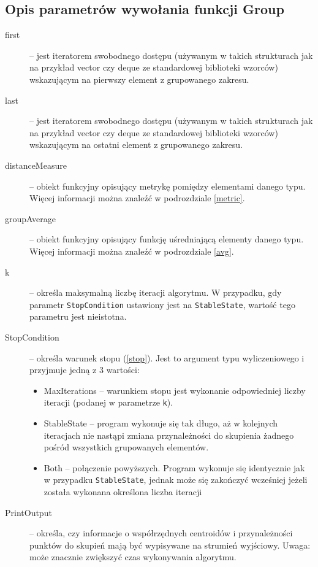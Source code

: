 \subsection{Opis parametrów wywołania funkcji Group}

\begin{description}
	\item[first] -- jest iteratorem swobodnego dostępu (używanym w takich strukturach jak na przykład vector czy deque ze standardowej biblioteki wzorców) wskazującym na pierwszy element z grupowanego zakresu.
	\item[last] -- jest iteratorem swobodnego dostępu (używanym w takich strukturach jak na przykład vector czy deque ze standardowej biblioteki wzorców) wskazującym na ostatni element z grupowanego zakresu.
	\item[distanceMeasure] -- obiekt funkcyjny opisujący metrykę pomiędzy elementami danego typu. Więcej informacji można znaleźć w podrozdziale \ref{metric}.
	\item[groupAverage] -- obiekt funkcyjny opisujący funkcję uśredniającą elementy danego typu. Więcej informacji można znaleźć w podrozdziale \ref{avg}.
	\item[k] -- określa maksymalną liczbę iteracji algorytmu. W przypadku, gdy parametr \texttt{StopCondition} ustawiony jest na \texttt{StableState}, wartość tego parametru jest nieistotna.
	\item[StopCondition] -- określa warunek stopu (\ref{stop}). Jest to argument typu wyliczeniowego i przyjmuje jedną z 3 wartości:
	\begin{itemize}
		\item MaxIterations -- warunkiem stopu jest wykonanie odpowiedniej liczby iteracji (podanej w parametrze \texttt{k}).
		\item StableState -- program wykonuje się tak długo, aż w kolejnych iteracjach nie nastąpi zmiana przynależności do skupienia żadnego pośród wszystkich grupowanych elementów.
		\item Both -- połączenie powyższych. Program wykonuje się identycznie jak w przypadku \texttt{StableState}, jednak może się zakończyć wcześniej jeżeli została wykonana określona liczba iteracji
	\end{itemize}
	\item[PrintOutput] -- określa, czy informacje o współrzędnych centroidów i przynależności punktów do skupień mają być wypisywane na strumień wyjściowy. Uwaga: może znacznie zwiększyć czas wykonywania algorytmu.
\end{description}


